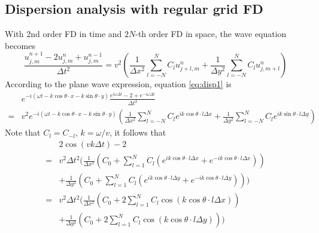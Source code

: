 \subsection{Dispersion analysis with regular grid FD \citep{liu2009new}}
With 2nd order FD in time and $2N$-th order FD in space, the wave equation becomes
\begin{equation}\label{eq:disp1}
\frac{u_{j,m}^{n+1}-2u_{j,m}^n+u_{j,m}^{n-1}}{\Delta t^2}
=v^2\left(\frac{1}{\Delta x^2}\sum_{l=-N}^{N}C_l u_{j+l,m}^n+
 \frac{1}{\Delta y^2}\sum_{l=-N}^{N}C_l u_{j,m+l}^n\right)
\end{equation}
According to the plane wave expression, equation \eqref{eq:disp1} is
\begin{equation}
\begin{split}
&e^{-i(\omega t- k\cos\theta \cdot x- k\sin\theta\cdot y)}\frac{e^{i\omega\Delta t}-2+e^{-i\omega\Delta t}}{\Delta t^2}\\
=&v^2 e^{-i(\omega t- k\cos\theta\cdot x- k\sin\theta\cdot y)}\left(
\frac{1}{\Delta x^2}\sum_{l=-N}^{N}C_l e^{i k\cos\theta \cdot l\Delta x}
+\frac{1}{\Delta y^2}\sum_{l=-N}^{N}C_l e^{i k\sin\theta \cdot l\Delta y}
\right)
\end{split}
\end{equation}
Note that $C_l=C_{-l}$, $k=\omega/v$, it follows that
\begin{equation}\label{eq:disp2}
\begin{split}
 &2\cos( v k\Delta t)-2\\
 =&v^2\Delta t^2 (
\frac{1}{\Delta x^2}(C_0+\sum_{l=1}^{N}C_l (e^{i k\cos\theta \cdot l\Delta x}+e^{-i k\cos\theta \cdot l\Delta x}))\\
&+\frac{1}{\Delta y^2}(C_0+\sum_{l=1}^{N}C_l (e^{i k\cos\theta \cdot l\Delta y}+e^{-i k\cos\theta \cdot l\Delta y}))
)\\
 =&v^2\Delta t^2 (
\frac{1}{\Delta x^2}(C_0+2\sum_{l=1}^{N}C_l \cos(k\cos\theta \cdot l\Delta x))\\
&+\frac{1}{\Delta y^2}(C_0+2\sum_{l=1}^{N}C_l \cos(k\cos\theta \cdot l\Delta y))
)\\
\end{split}
\end{equation}

